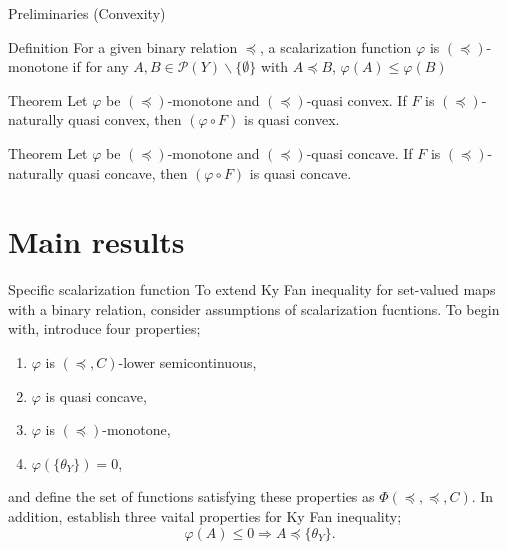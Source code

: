 \documentclass[aspectratio=169, dvipdfmx, 11pt]{beamer}
\begin{document}
\begin{frame}{Preliminaries (Convexity)}
  \begin{block}{Definition}
    For a given binary relation $\preccurlyeq$,
    a scalarization function $\varphi$ is $(\preccurlyeq)$-monotone if
    for any $A, B \in \mathcal{P}(Y) \backslash \{\emptyset\}$ with
    $A \preccurlyeq B$, $\varphi (A) \leq \varphi (B)$
  \end{block}

  \begin{block}{Theorem}
    Let $\varphi$ be $(\preccurlyeq)$-monotone and $(\preccurlyeq)$-quasi convex.
    If $F$ is $(\preccurlyeq)$-naturally quasi convex,
    then $(\varphi \circ F)$ is quasi convex.
  \end{block}

  \begin{block}{Theorem}
    Let $\varphi$ be $(\preccurlyeq)$-monotone and $(\preccurlyeq)$-quasi concave.
    If $F$ is $(\preccurlyeq)$-naturally quasi concave,
    then $(\varphi \circ F)$ is quasi concave.
  \end{block}
\end{frame}

\section{Main results}

\begin{frame}{Specific scalarization function}
  To extend Ky Fan inequality for set-valued maps with a binary relation, consider assumptions of scalarization fucntions. To begin with, introduce four properties;
  \begin{enumerate}
    \item $\varphi$ is $(\preceq, C)$-lower semicontinuous,
    \item $\varphi$ is quasi concave,
    \item $\varphi$ is $(\preccurlyeq)$-monotone,
    \item $\varphi(\{\theta_{Y}\}) = 0$,
  \end{enumerate}
  and define the set of functions satisfying these properties as $\Phi(\preceq, \preccurlyeq, C)$. In addition, establish three vaital properties for Ky Fan inequality;
  \begin{equation}
    \varphi (A) \leq 0 \Rightarrow A \preccurlyeq \{\theta_{Y}\}. \tag*{(A1)}
  \end{equation}
\end{frame}
\end{document}
